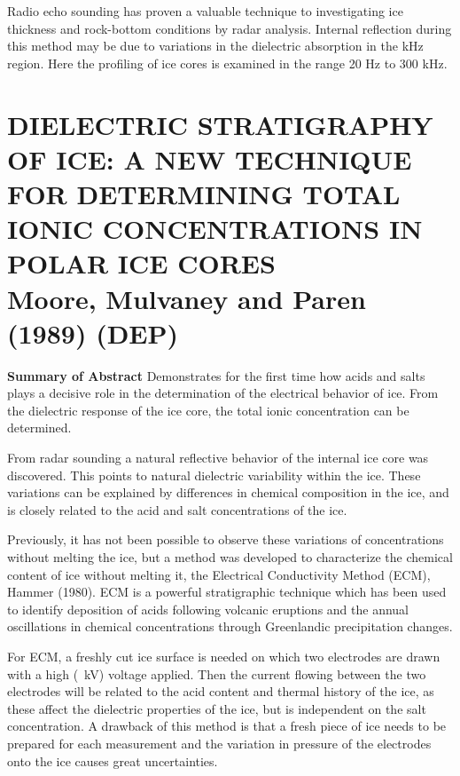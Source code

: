 \documentclass[11pt]{article}
\begin{document}
Radio echo sounding has proven a valuable technique to investigating ice thickness and rock-bottom conditions by radar analysis. Internal reflection during this method may be due to variations in the dielectric absorption in the kHz region. Here the profiling of ice cores is examined in the range 20 Hz to 300 kHz.

\section{DIELECTRIC STRATIGRAPHY OF ICE: A NEW TECHNIQUE FOR DETERMINING TOTAL IONIC CONCENTRATIONS IN POLAR ICE CORES \\ Moore, Mulvaney and Paren (1989) (DEP)}
\textbf{Summary of Abstract} Demonstrates for the first time how acids and salts plays a decisive role in the determination of the electrical behavior of ice. From the dielectric response of the ice core, the total ionic concentration can be determined.

From radar sounding a natural reflective behavior of the internal ice core was discovered. This points to natural dielectric variability within the ice. These variations can be explained by differences in chemical composition in the ice, and is closely related to the acid and salt concentrations of the ice.

Previously, it has not been possible to observe these variations of concentrations without melting the ice, but a method was developed to characterize the chemical content of ice without melting it, the Electrical Conductivity Method (ECM), Hammer (1980). ECM is a powerful stratigraphic technique which has been used to identify deposition of acids following volcanic eruptions and the annual oscillations in chemical concentrations through Greenlandic precipitation changes.

For ECM, a freshly cut ice surface is needed on which two electrodes are drawn with a high (~kV) voltage applied. Then the current flowing between the two electrodes will be related to the acid content and thermal history of the ice, as these affect the dielectric properties of the ice, but is independent on the salt concentration. A drawback of this method is that a fresh piece of ice needs to be prepared for each measurement and the variation in pressure of the electrodes onto the ice causes great uncertainties. 
\end{document}
